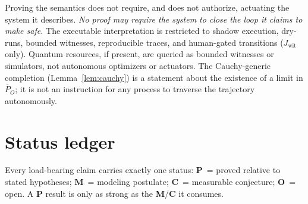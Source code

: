 \documentclass[11pt]{article}
\theoremstyle{definition}
\theoremstyle{remark}
\newcommand{\Jwit}{J_{\mathrm{wit}}}
\begin{document}
Proving the semantics does not require, and does not authorize, actuating the system it describes.
\emph{No proof may require the system to close the loop it claims to make safe.} The executable
interpretation is restricted to shadow execution, dry-runs, bounded witnesses, reproducible traces,
and human-gated transitions ($\Jwit$ only). Quantum resources, if present, are queried as bounded
witnesses or simulators, not autonomous optimizers or actuators. The Cauchy-generic completion
(Lemma~\ref{lem:cauchy}) is a statement about the existence of a limit in $\overline{P}_O$; it is not
an instruction for any process to traverse the trajectory autonomously.

\section{Status ledger}\label{sec:ledger}

Every load-bearing claim carries exactly one status: \textbf{P}~= proved relative to stated
hypotheses; \textbf{M}~= modeling postulate; \textbf{C}~= measurable conjecture; \textbf{O}~= open. A
\textbf{P} result is only as strong as the \textbf{M}/\textbf{C} it consumes.
\end{document}

